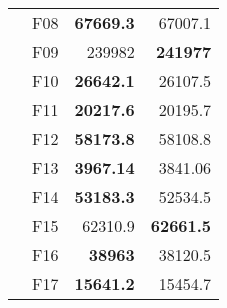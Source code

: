 \begin{table}[]
\begin{tabular}{ll|r|r|}
\multicolumn{1}{|l|}{\cellcolor[HTML]{ECF4FF}}                           & \cellcolor[HTML]{FCE6AB}F08     & \cellcolor[HTML]{D3FFB6}\textbf{67669.3}                       & 67007.1                                                   \\ \cline{2-4} 
\multicolumn{1}{|l|}{\cellcolor[HTML]{ECF4FF}}                           & \cellcolor[HTML]{FCE6AB}F09     & 239982                                                         & \cellcolor[HTML]{D3FFB6}\textbf{241977}                   \\ \cline{2-4} 
\multicolumn{1}{|l|}{\cellcolor[HTML]{ECF4FF}}                           & \cellcolor[HTML]{FCE6AB}F10     & \cellcolor[HTML]{D3FFB6}\textbf{26642.1}                       & 26107.5                                                   \\ \cline{2-4} 
\multicolumn{1}{|l|}{\cellcolor[HTML]{ECF4FF}}                           & \cellcolor[HTML]{FCE6AB}F11     & \cellcolor[HTML]{D3FFB6}\textbf{20217.6}                       & 20195.7                                                   \\ \cline{2-4} 
\multicolumn{1}{|l|}{\cellcolor[HTML]{ECF4FF}}                           & \cellcolor[HTML]{FCE6AB}F12     & \cellcolor[HTML]{D3FFB6}\textbf{58173.8}                       & 58108.8                                                   \\ \cline{2-4} 
\multicolumn{1}{|l|}{\cellcolor[HTML]{ECF4FF}}                           & \cellcolor[HTML]{FCE6AB}F13     & \cellcolor[HTML]{D3FFB6}\textbf{3967.14}                       & 3841.06                                                   \\ \cline{2-4} 
\multicolumn{1}{|l|}{\cellcolor[HTML]{ECF4FF}}                           & \cellcolor[HTML]{FCE6AB}F14     & \cellcolor[HTML]{D3FFB6}\textbf{53183.3}                       & 52534.5                                                   \\ \cline{2-4} 
\multicolumn{1}{|l|}{\cellcolor[HTML]{ECF4FF}}                           & \cellcolor[HTML]{FCE6AB}F15     & 62310.9                                                        & \cellcolor[HTML]{D3FFB6}\textbf{62661.5}                  \\ \cline{2-4} 
\multicolumn{1}{|l|}{\cellcolor[HTML]{ECF4FF}}                           & \cellcolor[HTML]{FCE6AB}F16     & \cellcolor[HTML]{D3FFB6}\textbf{38963}                         & 38120.5                                                   \\ \cline{2-4} 
\multicolumn{1}{|l|}{\cellcolor[HTML]{ECF4FF}}                           & \cellcolor[HTML]{FCE6AB}F17     & \cellcolor[HTML]{D3FFB6}\textbf{15641.2}                       & 15454.7                                                   \\ \cline{2-4} 

\end{tabular}
\end{table}

